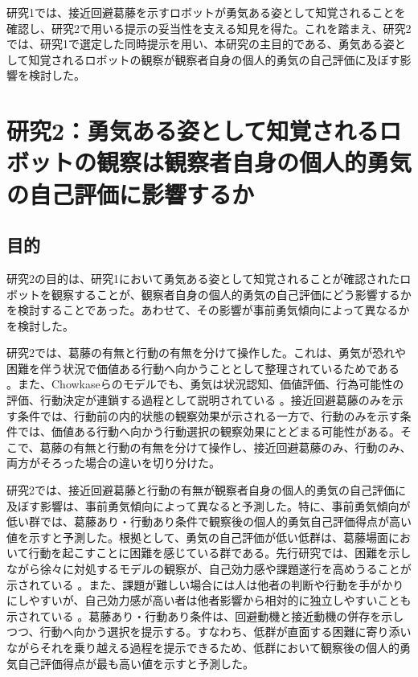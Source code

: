 \documentclass[utf8]{FrontiersinHarvard}
\begin{document}
研究1では、接近回避葛藤を示すロボットが勇気ある姿として知覚されることを確認し、研究2で用いる提示の妥当性を支える知見を得た。これを踏まえ、研究2では、研究1で選定した同時提示を用い、本研究の主目的である、勇気ある姿として知覚されるロボットの観察が観察者自身の個人的勇気の自己評価に及ぼす影響を検討した。

\section{研究2：勇気ある姿として知覚されるロボットの観察は観察者自身の個人的勇気の自己評価に影響するか}

\subsection{目的}

研究2の目的は、研究1において勇気ある姿として知覚されることが確認されたロボットを観察することが、観察者自身の個人的勇気の自己評価にどう影響するかを検討することであった。あわせて、その影響が事前勇気傾向によって異なるかを検討した。

研究2では、葛藤の有無と行動の有無を分けて操作した。これは、勇気が恐れや困難を伴う状況で価値ある行動へ向かうこととして整理されているためである \citep{rachman1984,woodard2007,norton2009}。また、Chowkaseらのモデルでも、勇気は状況認知、価値評価、行為可能性の評価、行動決定が連鎖する過程として説明されている \citep{chowkase2024}。接近回避葛藤のみを示す条件では、行動前の内的状態の観察効果が示される一方で、行動のみを示す条件では、価値ある行動へ向かう行動選択の観察効果にとどまる可能性がある。そこで、葛藤の有無と行動の有無を分けて操作し、接近回避葛藤のみ、行動のみ、両方がそろった場合の違いを切り分けた。

研究2では、接近回避葛藤と行動の有無が観察者自身の個人的勇気の自己評価に及ぼす影響は、事前勇気傾向によって異なると予測した。特に、事前勇気傾向が低い群では、葛藤あり・行動あり条件で観察後の個人的勇気自己評価得点が高い値を示すと予測した。根拠として、勇気の自己評価が低い低群は、葛藤場面において行動を起こすことに困難を感じている群である。先行研究では、困難を示しながら徐々に対処するモデルの観察が、自己効力感や課題遂行を高めうることが示されている \citep{schunk1987,schunk1989}。また、課題が難しい場合には人は他者の判断や行動を手がかりにしやすいが、自己効力感が高い者は他者影響から相対的に独立しやすいことも示されている \citep{lucas2006}。葛藤あり・行動あり条件は、回避動機と接近動機の併存を示しつつ、行動へ向かう選択を提示する。すなわち、低群が直面する困難に寄り添いながらそれを乗り越える過程を提示できるため、低群において観察後の個人的勇気自己評価得点が最も高い値を示すと予測した。
\end{document}

